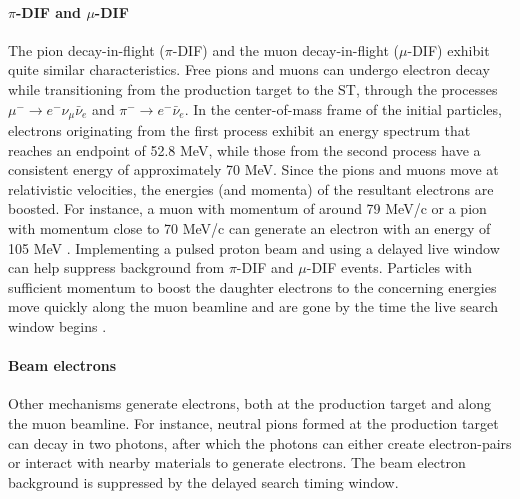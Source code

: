 \paragraph{$\pi$-DIF and $\mu$-DIF}
The pion decay-in-flight ($\pi$-DIF) and the muon decay-in-flight ($\mu$-DIF) 
exhibit quite similar characteristics. Free pions and muons can 
undergo electron decay while transitioning from the 
production target to the ST, through the processes 
$\mu^- \rightarrow e^- \nu_\mu \bar{\nu}_e$ and 
$\pi^- \rightarrow e^- \bar{\nu}_e$. In the center-of-mass 
frame of the initial particles, electrons originating 
from the first process exhibit an energy spectrum that 
reaches an endpoint of 52.8 MeV, while those from the 
second process have a consistent energy of approximately 
70 MeV. Since the pions and muons move at relativistic velocities, 
the energies (and momenta) of the resultant electrons are 
boosted. For instance, a muon with  momentum of around 
79 MeV/c or a pion with momentum close to 70 MeV/c can generate 
an electron with an energy of 105 MeV \cite{bartoszek2015mu2e}. 
Implementing a pulsed proton beam and using a delayed 
live window can help suppress background from $\pi$-DIF and 
$\mu$-DIF events. Particles with sufficient momentum 
to boost the daughter electrons to the concerning energies 
move quickly along the muon beamline and are gone by the 
time the live search window begins \cite{bobbb}. 


\paragraph{Beam electrons}\label{beamelectrons}
Other mechanisms generate electrons, both at the production target 
and along the muon beamline. For instance, neutral pions formed at 
the production target can decay in two photons, after which the 
photons can either create electron-pairs or interact with nearby 
materials to generate electrons. 
The beam electron background is suppressed by the delayed search timing window.


